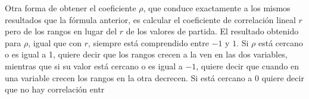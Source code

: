 Otra forma de obtener el coeficiente $\rho$, que conduce exactamente a los mismos resultados que la fórmula anterior, es calcular el
coeficiente de correlación lineal $r$ pero de los rangos en lugar del $r$ de los valores de partida. El resultado obtenido para $\rho$,
igual que con $r$, siempre está comprendido entre $-1$ y $1$. Si $\rho$ está cercano o es igual a 1, quiere decir que los rangos crecen a la
ven en las dos variables, mientras que si su valor está cercano o es igual a $-1$, quiere decir que cuando en una variable crecen los rangos
en la otra decrecen. Si está cercano a 0 quiere decir que no hay correlación entr
